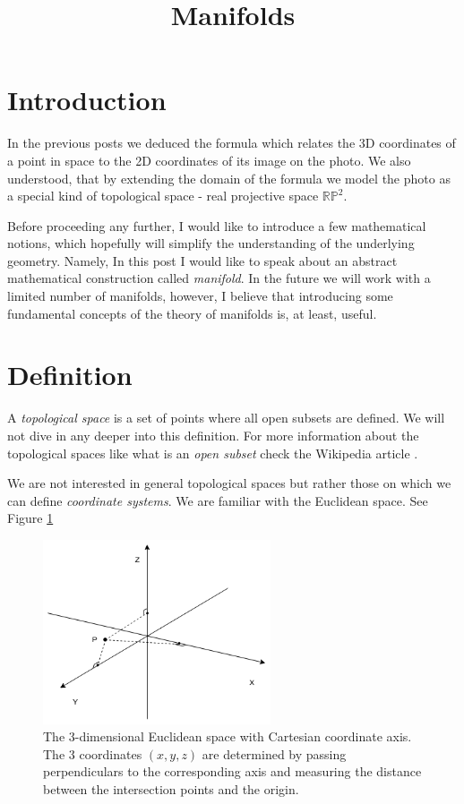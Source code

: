 \documentclass[a4paper,10pt]{article}
\title{}
\author{}
\title{Manifolds}
\date{}
\begin{document}
\maketitle

\section{Introduction}

In the previous posts we deduced the formula which relates the 3D coordinates of a point in space to the 2D coordinates of its image on the photo. We also understood, that by extending the domain of the formula we model the photo as a special kind of topological space - real projective space $\mathbb{RP}^2$. 

Before proceeding any further, I would like to introduce a few mathematical notions, which hopefully will simplify the understanding of the underlying geometry. Namely, In this post I would like to speak about an abstract mathematical construction called {\it manifold}. In the future we will work with a limited number of manifolds, however, I believe that introducing some fundamental concepts of the theory of manifolds is, at least, useful. 

\section{Definition}

A {\it topological space } is a set of points where all open subsets  are defined. We will not dive in any deeper into this definition. For more information about the topological spaces like what is an {\it open subset} check the Wikipedia article \cite{topspace}. 

We are not interested in general topological spaces but rather those on which we can define {\it coordinate systems}. We are familiar with the Euclidean space. See Figure \ref{fig:3dcart}

\begin{figure}[h]
\centering
 \includegraphics[width=0.6\textwidth]{../../images/3DEuclidean.png}
 \caption{The 3-dimensional Euclidean space with Cartesian coordinate axis. The 3 coordinates $(x,y,z)$ are determined by passing perpendiculars to the corresponding axis and measuring the distance between the intersection points and the origin. }
 \label{fig:3dcart}
\end{figure}
 
\end{document}
